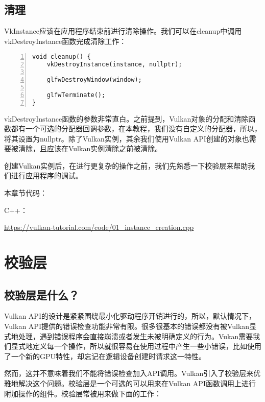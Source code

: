 \documentclass{ctexart}
\begin{document}
\subsection{清理}

VkInstance应该在应用程序结束前进行清除操作。我们可以在cleanup中调用vkDestroyInstance函数完成清除工作：

\begin{lstlisting}[language={[ANSI]C},keywordstyle=\color{blue!70},commentstyle=\color{red!50!green!50!blue!50},frame=shadowbox, rulesepcolor=\color{red!20!green!20!blue!20},basicstyle=\small,numbers=left, numberstyle=\tiny,breaklines=true]
void cleanup() {
	vkDestroyInstance(instance, nullptr);

	glfwDestroyWindow(window);

	glfwTerminate();
}
\end{lstlisting}

vkDestroyInstance函数的参数非常直白。之前提到，Vulkan对象的分配和清除函数都有一个可选的分配器回调参数，在本教程，我们没有自定义的分配器，所以，将其设置为nullptr。除了Vulkan实例，其余我们使用Vulkan API创建的对象也需要被清除，且应该在Vulkan实例清除之前被清除。

创建Vulkan实例后，在进行更复杂的操作之前，我们先熟悉一下校验层来帮助我们进行应用程序的调试。

本章节代码：

C++：

\url{https://vulkan-tutorial.com/code/01_instance_creation.cpp}

\newpage
\section{校验层}

\subsection{校验层是什么？}

Vulkan API的设计是紧紧围绕最小化驱动程序开销进行的，所以，默认情况下，Vulkan API提供的错误检查功能非常有限。很多很基本的错误都没有被Vulkan显式地处理，遇到错误程序会直接崩溃或者发生未被明确定义的行为。Vukan需要我们显式地定义每一个操作，所以就很容易在使用过程中产生一些小错误，比如使用了一个新的GPU特性，却忘记在逻辑设备创建时请求这一特性。

然而，这并不意味着我们不能将错误检查加入API调用。Vulkan引入了校验层来优雅地解决这个问题。校验层是一个可选的可以用来在Vulkan API函数调用上进行附加操作的组件。校验层常被用来做下面的工作：
\end{document}
